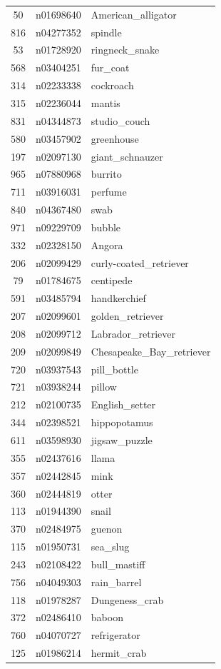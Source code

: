 \begin{table}
\begin{tabular}{cll}
50 & n01698640 & American_alligator \\
816 & n04277352 & spindle \\
53 & n01728920 & ringneck_snake \\
568 & n03404251 & fur_coat \\
314 & n02233338 & cockroach \\
315 & n02236044 & mantis \\
831 & n04344873 & studio_couch \\
580 & n03457902 & greenhouse \\
197 & n02097130 & giant_schnauzer \\
965 & n07880968 & burrito \\
711 & n03916031 & perfume \\
840 & n04367480 & swab \\
971 & n09229709 & bubble \\
332 & n02328150 & Angora \\
206 & n02099429 & curly-coated_retriever \\
79 & n01784675 & centipede \\
591 & n03485794 & handkerchief \\
207 & n02099601 & golden_retriever \\
208 & n02099712 & Labrador_retriever \\
209 & n02099849 & Chesapeake_Bay_retriever \\
720 & n03937543 & pill_bottle \\
721 & n03938244 & pillow \\
212 & n02100735 & English_setter \\
344 & n02398521 & hippopotamus \\
611 & n03598930 & jigsaw_puzzle \\
355 & n02437616 & llama \\
357 & n02442845 & mink \\
360 & n02444819 & otter \\
113 & n01944390 & snail \\
370 & n02484975 & guenon \\
115 & n01950731 & sea_slug \\
243 & n02108422 & bull_mastiff \\
756 & n04049303 & rain_barrel \\
118 & n01978287 & Dungeness_crab \\
372 & n02486410 & baboon \\
760 & n04070727 & refrigerator \\
125 & n01986214 & hermit_crab \\
\bottomrule
\end{tabular}
\end{table}
